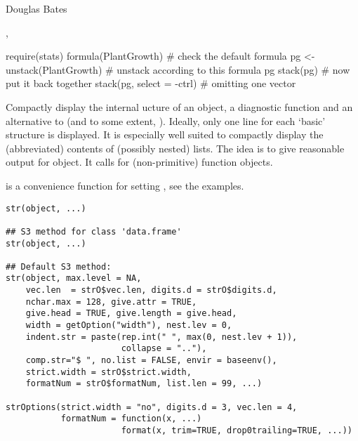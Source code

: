 %
\begin{Author}\relax
Douglas Bates
\end{Author}
%
\begin{SeeAlso}\relax
{}, 
\end{SeeAlso}
%
\begin{Examples}
\begin{ExampleCode}
require(stats)
formula(PlantGrowth)         # check the default formula
pg <- unstack(PlantGrowth)   # unstack according to this formula
pg
stack(pg)                    # now put it back together
stack(pg, select = -ctrl)    # omitting one vector
\end{ExampleCode}
\end{Examples}
%
\begin{Description}\relax
Compactly display the internal ucture of an \R{} object, a
diagnostic function and an alternative to 
(and to some extent, ).  Ideally, only one line for
each `basic' structure is displayed.  It is especially well suited
to compactly display the (abbreviated) contents of (possibly nested)
lists.  The idea is to give reasonable output for  \R{}
object.  It calls  for (non-primitive) function objects.

 is a convenience function for setting
, see the examples.
\end{Description}
%
\begin{Usage}
\begin{verbatim}
str(object, ...)

## S3 method for class 'data.frame'
str(object, ...)

## Default S3 method:
str(object, max.level = NA,
    vec.len  = strO$vec.len, digits.d = strO$digits.d,
    nchar.max = 128, give.attr = TRUE,
    give.head = TRUE, give.length = give.head,
    width = getOption("width"), nest.lev = 0,
    indent.str = paste(rep.int(" ", max(0, nest.lev + 1)),
                       collapse = ".."),
    comp.str="$ ", no.list = FALSE, envir = baseenv(),
    strict.width = strO$strict.width,
    formatNum = strO$formatNum, list.len = 99, ...)

strOptions(strict.width = "no", digits.d = 3, vec.len = 4,
           formatNum = function(x, ...)
                       format(x, trim=TRUE, drop0trailing=TRUE, ...))
\end{verbatim}
\end{Usage}
